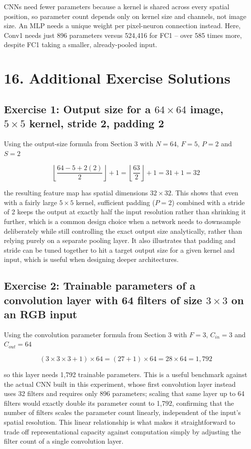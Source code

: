 \documentclass[11pt,a4paper]{article}
\begin{document}
CNNs need fewer parameters because a kernel is shared across every spatial position, so parameter count depends only on kernel size and channels, not image size. An MLP needs a unique weight per pixel-neuron connection instead. Here, Conv1 needs just 896 parameters versus 524{,}416 for FC1 -- over 585 times more, despite FC1 taking a smaller, already-pooled input.
 
\section*{16. Additional Exercise Solutions}
 
\subsection*{Exercise 1: Output size for a $64\times64$ image, $5\times5$ kernel, stride 2, padding 2}
 
Using the output-size formula from Section 3 with $N=64$, $F=5$, $P=2$ and $S=2$
 
\[
\left\lfloor\frac{64-5+2(2)}{2}\right\rfloor+1 = \left\lfloor\frac{63}{2}\right\rfloor+1 = 31+1 = 32
\]
 
the resulting feature map has spatial dimensions $32\times32$. This shows that even with a fairly large $5\times5$ kernel, sufficient padding ($P=2$) combined with a stride of 2 keeps the output at exactly half the input resolution rather than shrinking it further, which is a common design choice when a network needs to downsample deliberately while still controlling the exact output size analytically, rather than relying purely on a separate pooling layer. It also illustrates that padding and stride can be tuned together to hit a target output size for a given kernel and input, which is useful when designing deeper architectures.
\newpage
\subsection*{Exercise 2: Trainable parameters of a convolution layer with 64 filters of size $3\times3$ on an RGB input}
 
Using the convolution parameter formula from Section 3 with $F=3$, $C_{in}=3$ and $C_{out}=64$
 
\[
(3\times3\times3+1)\times64 = (27+1)\times64 = 28\times64 = 1{,}792
\]
 
so this layer needs 1{,}792 trainable parameters. This is a useful benchmark against the actual CNN built in this experiment, whose first convolution layer instead uses 32 filters and requires only 896 parameters; scaling that same layer up to 64 filters would exactly double its parameter count to 1{,}792, confirming that the number of filters scales the parameter count linearly, independent of the input's spatial resolution. This linear relationship is what makes it straightforward to trade off representational capacity against computation simply by adjusting the filter count of a single convolution layer.
 
\end{document}
